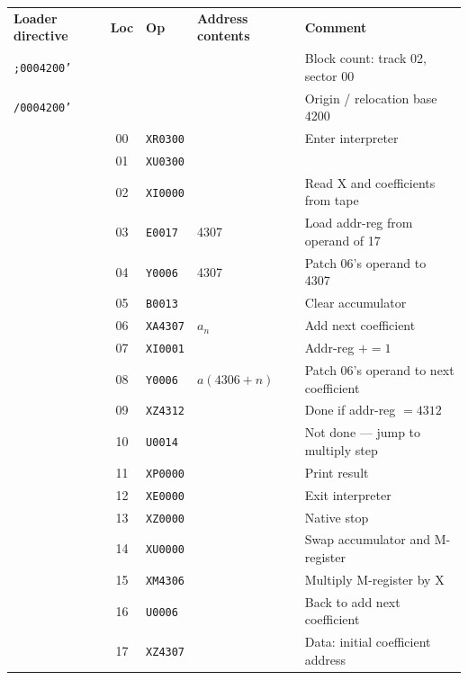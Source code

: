 \medskip
\noindent
\small
\ttfamily
\begin{tabular}{l|c|l|l|l}
\textbf{Loader directive} & \textbf{Loc} & \textbf{Op} & \textbf{Address contents} & \textbf{Comment} \\
\texttt{;0004200'} &    &           &        & Block count: track 02, sector 00 \\
\texttt{/0004200'} &    &           &        & Origin / relocation base 4200 \\
           & 00 & \texttt{XR0300}  &        & Enter interpreter \\
           & 01 & \texttt{XU0300}  &        & \\
           & 02 & \texttt{XI0000}  &        & Read X and coefficients from tape \\
           & 03 & \texttt{E0017}   & 4307   & Load addr-reg from operand of 17 \\
           & 04 & \texttt{Y0006}   & 4307   & Patch 06's operand to 4307 \\
           & 05 & \texttt{B0013}   &        & Clear accumulator \\
           & 06 & \texttt{XA4307}  & $a_n$  & Add next coefficient \\
           & 07 & \texttt{XI0001}  &        & Addr-reg $+= 1$ \\
           & 08 & \texttt{Y0006}   & $a(4306+n)$ & Patch 06's operand to next coefficient \\
           & 09 & \texttt{XZ4312}  &        & Done if addr-reg $= 4312$ \\
           & 10 & \texttt{U0014}   &        & Not done --- jump to multiply step \\
           & 11 & \texttt{XP0000}  &        & Print result \\
           & 12 & \texttt{XE0000}  &        & Exit interpreter \\
           & 13 & \texttt{XZ0000}  &        & Native stop \\
           & 14 & \texttt{XU0000}  &        & Swap accumulator and M-register \\
           & 15 & \texttt{XM4306}  &        & Multiply M-register by X \\
           & 16 & \texttt{U0006}   &        & Back to add next coefficient \\
           & 17 & \texttt{XZ4307}  &        & Data: initial coefficient address \\
\end{tabular}
\normalsize

